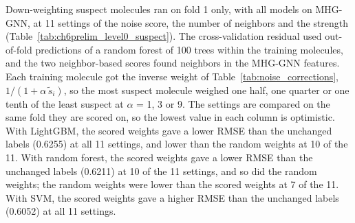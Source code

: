Down-weighting suspect molecules ran on fold 1 only, with all models on MHG-GNN, at 11 settings of the noise score, the number of neighbors and the strength (Table~\ref{tab:ch6prelim_level0_suspect}). The cross-validation residual used out-of-fold predictions of a random forest of 100 trees within the training molecules, and the two neighbor-based scores found neighbors in the MHG-GNN features. Each training molecule got the inverse weight of Table~\ref{tab:noise_corrections}, $1/(1 + \alpha\,\tilde s_i)$, so the most suspect molecule weighed one half, one quarter or one tenth of the least suspect at $\alpha$ = 1, 3 or 9. The settings are compared on the same fold they are scored on, so the lowest value in each column is optimistic. With LightGBM, the scored weights gave a lower RMSE than the unchanged labels (0.6255) at all 11 settings, and lower than the random weights at 10 of the 11. With random forest, the scored weights gave a lower RMSE than the unchanged labels (0.6211) at 10 of the 11 settings, and so did the random weights; the random weights were lower than the scored weights at 7 of the 11. With SVM, the scored weights gave a higher RMSE than the unchanged labels (0.6052) at all 11 settings.

